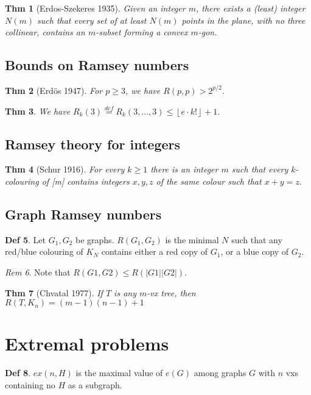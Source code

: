 \documentclass[11pt, fleqn, a4paper, landscape]{article}
\theoremstyle{plain} %
\newtheorem{thm}{Thm}
\theoremstyle{remark} %
\newtheorem{rem}[thm]{Rem}
\theoremstyle{definition} %
\newtheorem{defi}[thm]{Def}
\begin{document}
\begin{multicols}{5}
\begin{thm}[Erdos-Szekeres 1935]
Given an integer $m$, there exists a (least) integer $N(m)$ such
that every set of at least $N(m)$ points in the plane, with no three collinear, contains an $m$-subset forming a convex $m$-gon.
\end{thm}
\subsection{Bounds on Ramsey numbers}

\begin{thm}[Erdös 1947]
For $p \ge 3$, we have $R(p, p) > 2^{p/2}$.
\end{thm}

\begin{thm}
We have $R_k(3)\stackrel{def}{=}R_k(3,\dots,3)\le\left\lfloor e\cdot k!\right\rfloor+1$.
\end{thm}

\subsection{Ramsey theory for integers}

\begin{thm}[Schur 1916]
For every $k \ge 1$ there is an integer $m$ such that every $k$-colouring of [m] contains integers $x, y, z$ of the same colour such that $x + y = z.$
\end{thm}

\subsection{Graph Ramsey numbers}
\begin{defi}
Let $G_1,G_2$ be graphs. $R(G_1,G_2)$ is the minimal $N$ such that any red/blue colouring of $K_N$ contains either a red copy of $G_1$, or a blue copy of $G_2$.
\end{defi}

\begin{rem}
Note that $R(G1,G2) \le R(|G1||G2|)$.
\end{rem}

\begin{thm}[Chvatal 1977]
If $T$ is any $m$-vx tree, then $R(T,K_n) = (m - 1)(n - 1) + 1$
\end{thm}

\section{Extremal problems}
\addtocounter{thm}{1}
\begin{defi}
$ex(n,H)$ is the maximal value of $e(G)$ among graphs $G$ with $n$ vxs containing no $H$ as a subgraph.
\end{defi}
\addtocounter{thm}{1}

\end{multicols}
\end{document}
